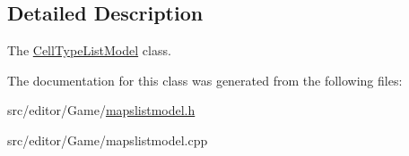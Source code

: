 \subsection{Detailed Description}
The \hyperlink{class_cell_type_list_model}{Cell\+Type\+List\+Model} class. 

The documentation for this class was generated from the following files\+:\begin{DoxyCompactItemize}
\item 
src/editor/\+Game/\hyperlink{mapslistmodel_8h}{mapslistmodel.\+h}\item 
src/editor/\+Game/mapslistmodel.\+cpp\end{DoxyCompactItemize}
